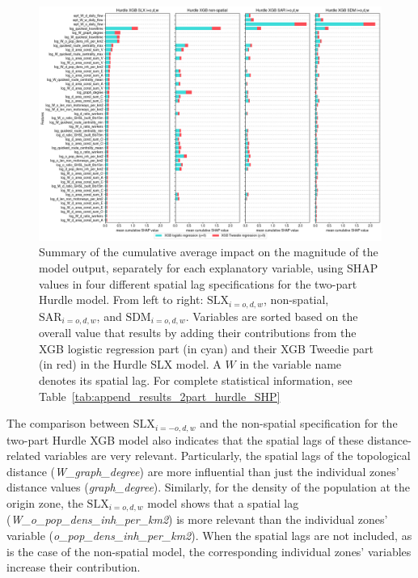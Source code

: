 \begin{figure}[ht!]
    \centering
    \includegraphics[width=1\textwidth]{fig_SHAP_importances_4models_SDM.png}
    \caption{Summary of the cumulative average impact on the magnitude of the model output, separately for each explanatory variable, using SHAP values \citep{Lundberg2017APredictions} in four different spatial lag specifications for the two-part Hurdle model. From left to right: $\text{SLX}_{i=o,d,w}$, non-spatial, $\text{SAR}_{i=o,d,w}$, and $\text{SDM}_{i=o,d,w}$. Variables are sorted based on the overall value that results by adding their contributions from the XGB logistic regression part (in cyan) and their XGB Tweedie part (in red) in the Hurdle SLX model. A $W$ in the variable name denotes its spatial lag. For complete statistical information, see Table~\ref{tab:append_results_2part_hurdle_SHP}}
    \label{fig:SHAP}
\end{figure}

The comparison between $\text{SLX}_{i=-o,d,w}$ and the non-spatial specification for the two-part Hurdle XGB model also indicates that the spatial lags of these distance-related variables are very relevant. Particularly, the spatial lags of the topological distance (\emph{W\_graph\_degree}) are more influential than just the individual zones' distance values (\emph{graph\_degree}). Similarly, for the density of the population at the origin zone, the $\text{SLX}_{i=o,d,w}$ model shows that a spatial lag (\emph{W\_o\_pop\_dens\_inh\_per\_km2}) is more relevant than the individual zones' variable (\emph{o\_pop\_dens\_inh\_per\_km2}).  When the spatial lags are not included, as is the case of the non-spatial model, the corresponding individual zones' variables increase their contribution.

